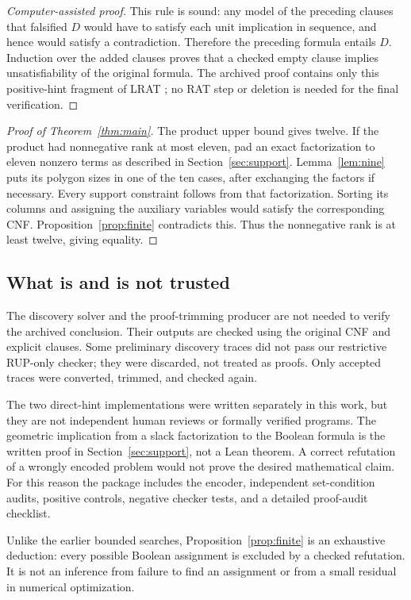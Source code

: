 \documentclass[11pt,a4paper]{article}
\theoremstyle{definition}\newtheorem{definition}[theorem]{Definition}
\theoremstyle{remark}\newtheorem{remark}[theorem]{Remark}
\begin{document}
\begin{proof}[Computer-assisted proof]
This rule is sound: any model of the preceding clauses that falsified $D$
would have to satisfy each unit implication in sequence, and hence would
satisfy a contradiction. Therefore the preceding formula entails $D$.
Induction over the added clauses proves that a checked empty clause implies
unsatisfiability of the original formula. The archived proof contains only
this positive-hint fragment of LRAT \cite{lrat}; no RAT step or deletion is
needed for the final verification.
\end{proof}

\begin{proof}[Proof of Theorem~\ref{thm:main}]
The product upper bound gives twelve. If the product had nonnegative rank at
most eleven, pad an exact factorization to eleven nonzero terms as described
in Section~\ref{sec:support}. Lemma~\ref{lem:nine} puts its polygon sizes in
one of the ten cases, after exchanging the factors if necessary.
Every support constraint follows from that factorization. Sorting its columns
and assigning the auxiliary variables would satisfy the corresponding CNF.
Proposition~\ref{prop:finite} contradicts this. Thus the nonnegative rank is
at least twelve, giving equality.
\end{proof}

\subsection{What is and is not trusted}
The discovery solver and the proof-trimming producer are not needed to verify
the archived conclusion. Their outputs are checked using the original CNF
and explicit clauses. Some preliminary discovery traces did not pass our
restrictive RUP-only checker; they were discarded, not treated as proofs.
Only accepted traces were converted, trimmed, and checked again.

The two direct-hint implementations were written separately in this work,
but they are not independent human reviews or formally verified programs.
The geometric implication from a slack factorization to the Boolean formula
is the written proof in Section~\ref{sec:support}, not a Lean theorem. A
correct refutation of a wrongly encoded problem would not prove the desired
mathematical claim. For this reason the package includes the encoder,
independent set-condition audits, positive controls, negative checker tests,
and a detailed proof-audit checklist.

Unlike the earlier bounded searches, Proposition~\ref{prop:finite} is an
exhaustive deduction: every possible Boolean assignment is excluded by a
checked refutation. It is not an inference from failure to find an assignment
or from a small residual in numerical optimization.
\end{document}
